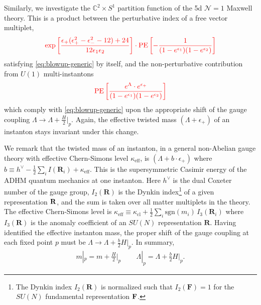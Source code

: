 \documentclass[letterpaper, 11pt]{article}
\def\IC{\mathbb{C}}
\def\CZ{{\cal Z}}
\def\e{\epsilon}
\begin{document}
Similarly, we investigate the $\IC^2 \times S^1$ partition function of the 5d $\mathcal{N}=1$ Maxwell theory. This is a product between the perturbative index of a free vector multiplet,
\begin{align}
  \color{red}  \exp\left[ \frac{\e_+(\e_+^2 - \e_-^2 - 12) + 24}{12\e_1\e_2}\right] \cdot  \text{PE}\left[-\frac{1}{(1-e^{\e_1})(1-e^{\e_2})}\right]
\end{align}
satisfying \eqref{eq:blowup-generic} by itself, and the non-perturbative contribution from $U(1)$ multi-instantons
\begin{align}
  \color{red}   \text{PE}\left[\frac{e^\Lambda \cdot e^{\e_+}}{(1-e^{\e_1})(1-e^{\e_2})}\right]
\end{align}
which comply with \eqref{eq:blowup-generic} upon the appropriate shift of the gauge coupling $\Lambda \rightarrow \Lambda + \frac{H}{2}|_p$. 
Again, the effective twisted mass $(\Lambda + \epsilon_+)$ of an instanton stays invariant under this change. 

We remark that the twisted mass of an instanton, in a general non-Abelian gauge theory with effective Chern-Simons level $\kappa_\text{eff}$, is $(\Lambda + b \cdot  \epsilon_+)$ where $b \equiv h^\vee  - \frac{1}{2}\sum_{i}I(\mathbf{R}_i) + \kappa_\text{eff}$. This is the supersymmetric Casimir energy of the ADHM quantum mechanics at one instanton. Here $h^\vee$ is the dual Coxeter number of the gauge group, $I_2(\mathbf{R})$ is the Dynkin index\footnote{The Dynkin index $I_2(\mathbf{R})$ is normalized such that $I_2(\mathbf{F}) = 1$ for the $SU(N)$ fundamental representation $\bf F$.} of a given representation $\bf R$, and the sum is taken over all matter multiplets in the theory. The effective Chern-Simons level is  $\kappa_\text{eff} \equiv \kappa_\text{cl} + \frac{1}{2}\sum_i \text{sgn}(m_i)\,I_3(\mathbf{R}_i)$  where $I_3(\mathbf{R})$ is the anomaly coefficient of an $SU(N)$ representation $\mathbf{R}$. Having identified the effective instanton mass,  the proper shift of the gauge coupling at each fixed point $p$ must be $\Lambda \rightarrow \Lambda + \frac{b}{2}H|_p$. In summary,
\begin{align}
  m|_p = m + \frac{H}{2}\bigg|_p\, \qquad \Lambda|_p = \Lambda + \frac{b}{2}H|_p.
\end{align}
\end{document}

